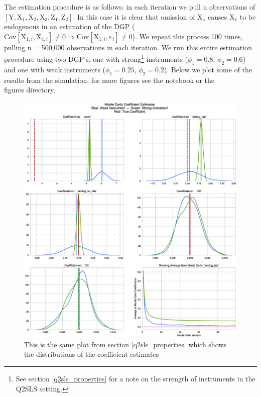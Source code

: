\documentclass[12pt]{article}
\newcommand{\Cov}{\mathrm{Cov}}
\begin{document}
The estimation procedure is as follows: in each iteration we pull n observations of $[\mathrm{Y}, \mathrm{X}_1, \mathrm{X}_2, \mathrm{X}_3, \mathrm{Z}_1, \mathrm{Z}_2]$. In this case it is clear that omission of $\mathrm{X}_4$ causes $\mathrm{X}_1$ to be endogenous in an estimation of the DGP ($\Cov[\mathrm{X}_{1, i}, \mathrm{X}_{4, i}] \ne 0 \Rightarrow \mathrm{Cov}[\mathrm{X}_{1, i}, \mathrm{\varepsilon}_{i}]  \ne 0 $). We repeat this process 100 times, pulling n = 500,000 observations in each iteration. We run this entire estimation procedure using two DGP's, one with strong\footnote{See section \ref{q2sls_properties} for a note on the strength of instruments in the Q2SLS setting.} instruments ($\phi_1 = 0.8$, $\phi_2 = 0.6$) and one with weak instruments ($\phi_1 = 0.25$, $\phi_2 = 0.2$). Below we plot some of the results from the simulation, for more figures see the notebook or the \\figures directory.

\begin{figure}[H]
\centering
\includegraphics[width=1\linewidth,keepaspectratio]{figures/MC_strong_and_weak.eps}
\caption{This is the same plot from section \ref{q2sls_properties} which shows the distributions of the coefficient estimates}
\end{figure}
\end{document}

